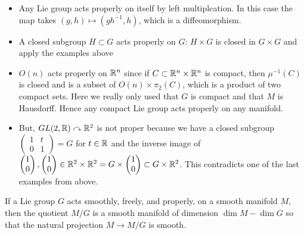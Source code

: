 \documentclass{../mathnotes}
\def\acts{\curvearrowright}
\begin{document}
\begin{exmp}
    \begin{itemize}
        \item Any Lie group acts properly on itself by left multiplcation. In this case the map takes $(g,h)\mapsto(gh^{-1},h)$, which is
            a diffeomorphism.
        \item A closed subgroup $H\subset G$ acts properly on $G$: $H\times G$ is closed in $G\times G$ and apply the examples above
        \item $O(n)$ acts properly on $\mathbb{R}^n$ since if $C\subset\mathbb{R}^n\times \mathbb{R}^n$ is compact, then $\mu^{-1}(C)$ is closed and is a subset of $O(n)\times \pi_2(C)$,
            which is a product of two compact sets. Here we really only used that $G$ is compact and that $M$ is Hausdorff. Hence any compact Lie group acts properly
            on any manifold.
        \item But, $GL(2,\R)\acts\R^2$ is not proper because we have a closed subgroup $\begin{pmatrix}1&t\\0&1\end{pmatrix}=G$ for $t\in \mathbb{R}$
            and the inverse image of $\begin{pmatrix}1\\0\end{pmatrix},\begin{pmatrix}1\\0\end{pmatrix}\in\mathbb{R}^2\times\mathbb{R}^2=G\times \begin{pmatrix}1\\0\end{pmatrix}\subset G\times\mathbb{R}^2$.
            This contradicts one of the last examples from above.
    \end{itemize}
\end{exmp}

\begin{thm}
    If a Lie group $G$ acts smoothly, freely, and properly, on a smooth manifold $M$, then the quotient $M/G$ is a smooth manifold of dimension $\dim M-\dim G$ so that
    the natural projection $M\to M/G$ is smooth.
\end{thm}
\end{document}
